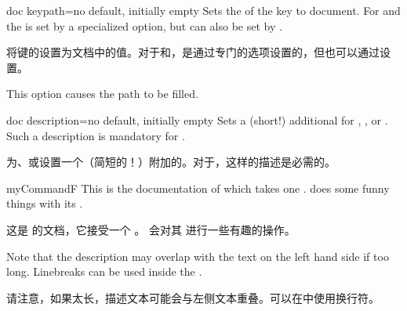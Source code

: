 \begin{docTcbKey}[][doc new={2020-04-22}]{doc keypath}{=}{no default, initially empty}
Sets the  of the key to document. For 
and  the   is set by a specialized option,
but can also be set by .

将键的设置为文档中的值。对于和，是通过专门的选项设置的，但也可以通过设置。
\begin{dispExample}
\begin{docKeys}[
doc no index,  %
doc keypath     = tikz,
doc name        = fill,
doc parameter   = \colOpt{=\meta{color}},
doc description = default is scope's color setting,
] {}
This option causes the path to be filled.
\end{docKeys}
\end{dispExample}
\end{docTcbKey}


\begin{docTcbKey}{doc description}{=}{no default, initially empty}
Sets a (short!) additional  for
, , or .
Such a description is
mandatory for .

为、或设置一个（简短的！）附加的。对于，这样的描述是必需的。
\begin{dispExample}
\begin{docCommand*}[doc description=my description]{myCommandF}{}
This is the documentation of  which takes one .
 does some funny things with its .

这是  的文档，它接受一个 。  会对其  进行一些有趣的操作。
\end{docCommand*}
\end{dispExample}
\begin{marker}
Note that the description  may overlap with the text on the left
hand side if too long. Linebreaks can be used inside the .

请注意，如果太长，描述文本可能会与左侧文本重叠。可以在中使用换行符。
\end{marker}
\end{docTcbKey}


